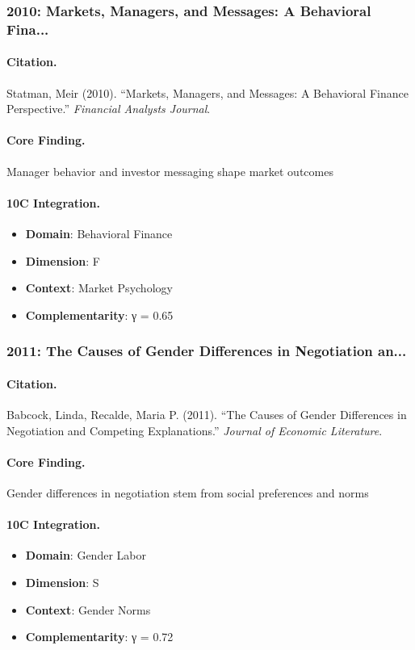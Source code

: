\subsubsection{2010: Markets, Managers, and Messages: A Behavioral Fina...}

\paragraph{Citation.}
Statman, Meir (2010). ``Markets, Managers, and Messages: A Behavioral Finance Perspective.''
\textit{Financial Analysts Journal}.

\paragraph{Core Finding.}
Manager behavior and investor messaging shape market outcomes

\paragraph{10C Integration.}
\begin{itemize}[nosep]
  \item \textbf{Domain}: Behavioral Finance
  \item \textbf{Dimension}: F
  \item \textbf{Context}: Market Psychology
  \item \textbf{Complementarity}: γ = 0.65
\end{itemize}

\subsubsection{2011: The Causes of Gender Differences in Negotiation an...}

\paragraph{Citation.}
Babcock, Linda, Recalde, Maria P. (2011). ``The Causes of Gender Differences in Negotiation and Competing Explanations.''
\textit{Journal of Economic Literature}.

\paragraph{Core Finding.}
Gender differences in negotiation stem from social preferences and norms

\paragraph{10C Integration.}
\begin{itemize}[nosep]
  \item \textbf{Domain}: Gender Labor
  \item \textbf{Dimension}: S
  \item \textbf{Context}: Gender Norms
  \item \textbf{Complementarity}: γ = 0.72
\end{itemize}

